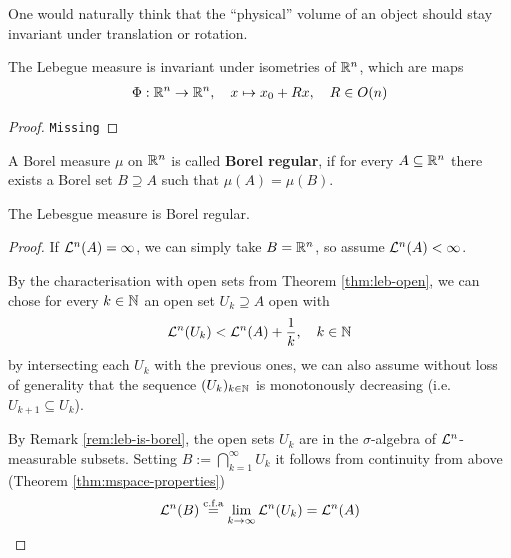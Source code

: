 One would naturally think that the ``physical'' volume of an object should stay invariant under translation or rotation.

\begin{thm}[]
  The Lebegue measure is invariant under isometries of $\mathbb{R}^{n}$, which are maps
  \begin{align*}
    \Phi: \mathbb{R}^{n} \to \mathbb{R}^{n}, \quad x \mapsto x_0 + Rx, \quad R \in O(n)
  \end{align*}
\end{thm}
\begin{proof}
  \texttt{Missing}
\end{proof}


\begin{dfn}[]
  A Borel measure $\mu$ on $\mathbb{R}^{n}$ is called \textbf{Borel regular}, if for every $A \subseteq \mathbb{R}^{n}$ there exists a Borel set $B \supseteq A$ such that $\mu(A) = \mu(B)$.
\end{dfn}

\begin{lem}[]
  The Lebesgue measure is Borel regular.
\end{lem}
\begin{proof}
  If $\mathcal{L}^{n}(A) = \infty$, we can simply take $B =  \mathbb{R}^{n}$, so assume $\mathcal{L}^{n}(A) < \infty$.

  By the characterisation with open sets from Theorem \ref{thm:leb-open}, we can chose for every $k \in \mathbb{N}$ an open set $U_k \supseteq A$ open with
  \begin{align*}
    \mathcal{L}^{n}(U_k) < \mathcal{L}^{n}(A) +  \frac{1}{k}, \quad k \in \mathbb{N}
  \end{align*}
  by intersecting each $U_k$ with the previous ones, 
  we can also assume without loss of generality that the sequence $(U_k)_{k \in \mathbb{N}}$ is monotonously decreasing (i.e. $U_{k+1} \subseteq U_k$).

  By Remark \ref{rem:leb-is-borel}, the open sets $U_k$ are in the $\sigma$-algebra of $\mathcal{L}^{n}$-measurable subsets.
  Setting $B := \bigcap_{k=1}^{\infty}U_k$ it follows from continuity from above (Theorem \ref{thm:mspace-properties})
  \begin{align*}
    \mathcal{L}^{n}(B) \stackrel{\text{c.f.a}}{=} \lim_{k \to \infty} \mathcal{L}^{n}(U_k) = \mathcal{L}^{n}(A)
  \end{align*}
\end{proof}


